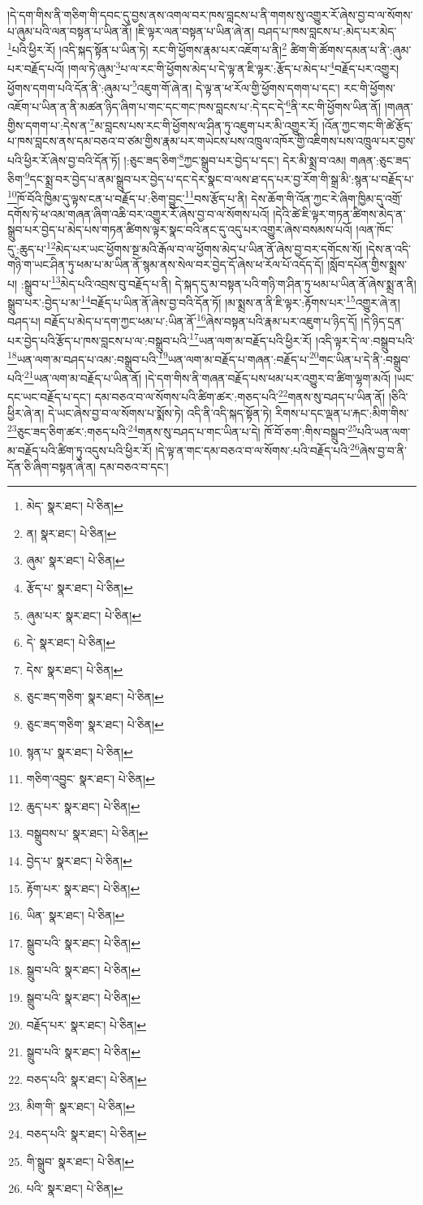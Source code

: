 །དེ་དག་གིས་ནི་གཅིག་གི་དབང་དུ་བྱས་ནས་འགལ་བར་ཁས་བླངས་པ་ནི་གགས་སུ་འགྱུར་རོ་ཞེས་བྱ་བ་ལ་སོགས་པ་ཞུམ་པའི་ལན་བསྟན་པ་ཡིན་ནོ། །ཇི་ལྟར་ལན་བསྟན་པ་ཡིན་ཞེ་ན། བཤད་པ་ཁས་བླངས་པ་:མེད་པར་མེད་\footnote{མེད་  སྣར་ཐང་།  པེ་ཅིན། }པའི་ཕྱིར་རོ། །འདི་སྐད་སྟོན་པ་ཡིན་ཏེ། རང་གི་ཕྱོགས་རྣམ་པར་འཇོག་པ་ནི།\footnote{ན།  སྣར་ཐང་།  པེ་ཅིན། } ཚིག་གི་ཚོགས་དམན་པ་ནི་:ཞུམ་པར་བརྗོད་པའོ། །གལ་ཏེ་ཞུམ་\footnote{ཞུམ་  སྣར་ཐང་།  པེ་ཅིན། }པ་ལ་རང་གི་ཕྱོགས་མེད་པ་དེ་ལྟ་ན་ཇི་ལྟར་:རྩོད་པ་མེད་པ་\footnote{རྩོད་པ་  སྣར་ཐང་།  པེ་ཅིན། }བརྗོད་པར་འགྱུར། ཕྱོགས་དགག་པའི་དོན་ནི་:ཞུམ་པ་\footnote{ཞུམ་པར་  སྣར་ཐང་།  པེ་ཅིན། }འཇུག་གོ་ཞེ་ན། དེ་ལྟ་ན་ཕ་རོལ་གྱི་ཕྱོགས་དགག་པ་དང་། རང་གི་ཕྱོགས་འཇོག་པ་ཡིན་ན་ནི་མཚན་ཉིད་ཞིག་པ་གང་དང་གང་ཁས་བླངས་པ་:དེ་དང་དེ་\footnote{དེ་  སྣར་ཐང་།  པེ་ཅིན། }ནི་རང་གི་ཕྱོགས་ཡིན་ནོ། །གཞན་གྱིས་དགག་པ་:དེས་ན་\footnote{དེས་  སྣར་ཐང་།  པེ་ཅིན། }མ་བླངས་པས་རང་གི་ཕྱོགས་ལ་ཤིན་ཏུ་འཇུག་པར་མི་འགྱུར་རོ། །འོན་ཀྱང་གང་གི་ཚེ་རྩོད་པ་ཁས་བླངས་ནས་དམ་བཅའ་བ་ཙམ་གྱིས་རྣམ་པར་གཡེངས་པས་འཁྲུལ་འཁོར་གྱི་འཇིགས་པས་འཁྲུལ་པར་བྱས་པའི་ཕྱིར་རོ་ཞེས་བྱ་བའི་དོན་ཏོ། །:ཅུང་ཟད་ཅིག་\footnote{ཅུང་ཟད་གཅིག་  སྣར་ཐང་།  པེ་ཅིན། }ཀྱང་སྒྲུབ་པར་བྱེད་པ་དང་། དེར་མི་སྨྲ་བ་འམ། གཞན་:ཅུང་ཟད་ཅིག་\footnote{ཅུང་ཟད་གཅིག་  སྣར་ཐང་།  པེ་ཅིན། }དང་སྨྲ་བར་བྱེད་པ་ནམ་སྒྲུབ་པར་བྱེད་པ་དང་དེར་སྣང་བ་ལས་ཐ་དད་པར་བྱ་རོག་གི་སྒྲ་མི་:སྙན་པ་བརྗོད་པ་\footnote{སྙན་པ་  སྣར་ཐང་།  པེ་ཅིན། }ཁོ་བོའི་ཁྱིམ་དུ་ལྟས་ངན་པ་བརྗོད་པ་:ཅིག་བྱུང་\footnote{གཅིག་འབྱུང་  སྣར་ཐང་།  པེ་ཅིན། }བས་རྩོད་པ་ནི། དེས་ཆོག་གི་འོན་ཀྱང་རེ་ཞིག་ཁྱིམ་དུ་འགྲོ་དགོས་ཏེ་ཕ་འམ་གཞན་ཞིག་འཆི་བར་འགྱུར་རོ་ཞེས་བྱ་བ་ལ་སོགས་པའོ། །དེའི་ཚེ་ཇི་ལྟར་གཏན་ཚིགས་མེད་ན་སྒྲུབ་པར་བྱེད་པ་མེད་པས་གཏན་ཚིགས་ལྟར་སྣང་བའི་ནང་དུ་འདུ་པར་འགྱུར་ཞེས་བསམས་པའོ། །ལན་ཁོང་དུ་:ཆུད་པ་\footnote{ཆུད་པར་  སྣར་ཐང་།  པེ་ཅིན། }མེད་པར་ཡང་ཕྱོགས་སྔ་མའི་རྒོལ་བ་ལ་ཕྱོགས་མེད་པ་ཡིན་ནོ་ཞེས་བྱ་བར་དགོངས་སོ། །དེས་ན་འདི་གཉི་ག་ཡང་ཤིན་ཏུ་ཕམ་པ་མ་ཡིན་ནོ་སྙམ་ནས་སེལ་བར་བྱེད་དོ་ཞེས་ཕ་རོལ་པོ་འདོད་དོ། །སློབ་དཔོན་གྱིས་སྨྲས་པ། :སྒྲུབ་པ་\footnote{བསྒྲུབས་པ་  སྣར་ཐང་།  པེ་ཅིན། }མེད་པའི་འབྲས་བུ་བརྗོད་པ་ནི། དེ་སྐད་དུ་མ་བསྟན་པའི་གཉི་ག་ཤིན་ཏུ་ཕམ་པ་ཡིན་ནོ་ཞེས་སྨྲ་ན་ནི། སྒྲུབ་པར་:བྱེད་པ་མ་\footnote{བྱེད་པ་  སྣར་ཐང་།  པེ་ཅིན། }བརྗོད་པ་ཡིན་ནོ་ཞེས་བྱ་བའི་དོན་ཏོ། །མ་སྨྲས་ན་ནི་ཇི་ལྟར་:རྟོགས་པར་\footnote{རྟོག་པར་  སྣར་ཐང་།  པེ་ཅིན། }འགྱུར་ཞེ་ན། བཤད་པ། བརྗོད་པ་མེད་པ་དག་ཀྱང་ཕམ་པ་:ཡིན་ནོ་\footnote{ཡིན་  སྣར་ཐང་།  པེ་ཅིན། }ཞེས་བསྟན་པའི་རྣམ་པར་འཇུག་པ་ཉིད་དོ། །དེ་ཉིད་དྲན་པར་བྱེད་པའི་རྩོད་པ་ཁས་བླངས་པ་ལ་:བསྒྲུབ་པའི་\footnote{སྒྲུབ་པའི་  སྣར་ཐང་།  པེ་ཅིན། }ཡན་ལག་མ་བརྗོད་པའི་ཕྱིར་རོ། །འདི་ལྟར་དེ་ལ་:བསྒྲུབ་པའི་\footnote{སྒྲུབ་པའི་  སྣར་ཐང་།  པེ་ཅིན། }ཡན་ལག་མ་བཤད་པ་འམ་:བསྒྲུབ་པའི་\footnote{སྒྲུབ་པའི་  སྣར་ཐང་།  པེ་ཅིན། }ཡན་ལག་མ་བརྗོད་པ་གཞན་:བརྗོད་པ་\footnote{བརྗོད་པར་  སྣར་ཐང་།  པེ་ཅིན། }གང་ཡིན་པ་དེ་ནི་:བསྒྲུབ་པའི་\footnote{སྒྲུབ་པའི་  སྣར་ཐང་།  པེ་ཅིན། }ཡན་ལག་མ་བརྗོད་པ་ཡིན་ནོ། །དེ་དག་གིས་ནི་གཞན་བརྗོད་པས་ཕམ་པར་འགྱུར་བ་ཚིག་ལྷག་མའོ། །ཡང་དང་ཡང་བརྗོད་པ་དང་། དམ་བཅའ་བ་ལ་སོགས་པའི་ཚིག་ཚར་:གཅད་པའི་\footnote{བཅད་པའི་  སྣར་ཐང་།  པེ་ཅིན། }གནས་སུ་བཤད་པ་ཡིན་ནོ། །ཅིའི་ཕྱིར་ཞེ་ན། དེ་ཡང་ཞེས་བྱ་བ་ལ་སོགས་པ་སྨོས་ཏེ། འདི་ནི་འདི་སྐད་སྟོན་ཏེ། རིགས་པ་དང་ལྡན་པ་རྐང་:མིག་གིས་\footnote{མིག་གི་  སྣར་ཐང་།  པེ་ཅིན། }ཅུང་ཟད་ཅིག་ཚར་:གཅད་པའི་\footnote{བཅད་པའི་  སྣར་ཐང་།  པེ་ཅིན། }གནས་སུ་བཤད་པ་གང་ཡིན་པ་དེ། ཁོ་བོ་ཅག་:གིས་བསྒྲུབ་\footnote{གི་སྒྲུབ་  སྣར་ཐང་།  པེ་ཅིན། }པའི་ཡན་ལག་མ་བརྗོད་པའི་ཚིག་ཏུ་འདུས་པའི་ཕྱིར་རོ། །དེ་ལྟ་ན་གང་དམ་བཅའ་བ་ལ་སོགས་:པའི་བརྗོད་པའི་\footnote{པའི་  སྣར་ཐང་།  པེ་ཅིན། }ཞེས་བྱ་བ་ནི་དོན་ཅི་ཞིག་བསྟན་ཞེ་ན། དམ་བཅའ་བ་དང་། 